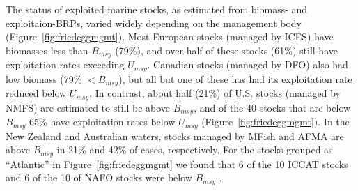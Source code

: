 The status of exploited marine stocks, as estimated from biomass- and
exploitaion-BRPs, varied widely depending on the management body
(Figure~\ref{fig:friedeggmgmt}). Most European stocks (managed by
ICES) have biomasses less than $B_{msy}$
(79\%), and over half of these
stocks (61\%) still
have exploitation rates exceeding $U_{msy}$. Canadian stocks (managed
by DFO) also had low biomass (79\%
$< B_{msy}$), but all but one of these has had its exploitation rate
reduced below $U_{msy}$. In contrast, about half
(21\%) of U.S. stocks (managed by
NMFS) are estimated to still be above $B_{msy}$, and of the
40 stocks that are below $B_{msy}$
65\% have exploitation
rates below $U_{msy}$ (Figure~\ref{fig:friedeggmgmt}). In the New
Zealand and Australian waters, stocks managed by MFish and AFMA are
above $B_{msy}$ in 21\% and
42\% of cases, respectively. For
the stocks grouped as ``Atlantic'' in Figure~\ref{fig:friedeggmgmt} we
found that 6 of the
10 ICCAT stocks and
6 of the
10 of NAFO stocks were below $B_{msy}$ .





 

